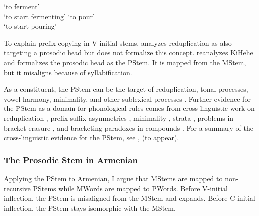 \begin{exe}
	\ex 
	\begin{multicols}{2}
		\begin{xlist}
			\ex {}`to ferment'\label{disskihehe c redchaptergbbdff}\\
			`to start fermenting'
			\ex {}`to pour'\label{disskihehe v redchaptergbbdff}\\
			`to start pouring'
		\end{xlist}
		
	\end{multicols}
\end{exe}

To explain  prefix-copying   in V-initial stems, \citet{Aronoff-1988-HeadOperationsStrateRED} analyzes reduplication as also targeting a prosodic head but does not formalize this concept.  \citet{Downing-1998-ProsodicMisalignmentReduplication} reanalyzes KiHehe   and formalizes the prosodic head as the PStem. It is mapped from the MStem, but it misaligns because of syllabification.

As a constituent, the PStem can be the target of reduplication, tonal processes, vowel harmony, minimality,  and other sublexical processes \citep{Downing-1998-ProsodicMisalignmentOnsetlessNLLT,Downing-1999-ProsodicStem,Downing-1999-VerbalRed3BantuLanguages}.   Further evidence for the PStem as a domain for phonological rules comes from cross-linguistic work on reduplication \citep{FitzpatrickCole-1994-ProsodicHierarchyReduplication,InkelasZoll2005-MorphoDouble,Shaw-2005-NonAdjacencyRed}, prefix-suffix asymmetries \citep{Hyman-2008-DirectionalAsymmetries}, minimality \citep{Downing-2005-MorphoCompelexityProsodicMinimality,Downing-2006-CanonicalForms}, strata \citep{Inkelas-1989-ProsodicLexicon,Inkelas-1993-DerivingCyclicity}, problems in bracket erasure \citep{Inkelas-2014-Interplay}, and   bracketing paradoxes in compounds \citep{Han-1995-ProsodicStructureCompounds}. For a summary of the cross-linguistic evidence for the PStem, see \citet{Downing-2006-CanonicalForms,Downing-2016-ProsodicLevelsChichewa},  \citeauthor{DowningKadenge-2020-ReplacingPStemProsodicHierarchy} (to appear).

\subsubsection{The Prosodic Stem in Armenian}\label{disssection: reduction: destressed reduction EA: pstem: apply}
Applying the PStem to Armenian, I argue that MStems are mapped to non-recursive PStems while MWords are mapped to PWords. Before V-initial inflection, the PStem is misaligned from the MStem and expands. Before C-initial inflection, the PStem stays isomorphic with the MStem.


